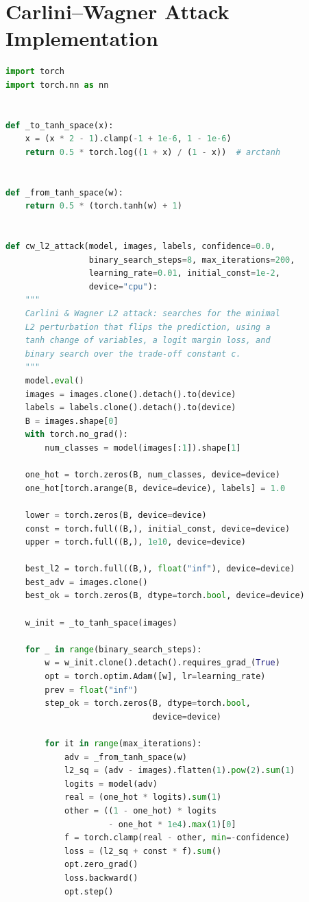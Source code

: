 \section{Carlini--Wagner Attack Implementation}

\begin{lstlisting}[language=Python, caption={Carlini--Wagner $L_2$ Attack Implementation}, label={lst:cw}]
import torch
import torch.nn as nn


def _to_tanh_space(x):
    x = (x * 2 - 1).clamp(-1 + 1e-6, 1 - 1e-6)
    return 0.5 * torch.log((1 + x) / (1 - x))  # arctanh


def _from_tanh_space(w):
    return 0.5 * (torch.tanh(w) + 1)


def cw_l2_attack(model, images, labels, confidence=0.0,
                 binary_search_steps=8, max_iterations=200,
                 learning_rate=0.01, initial_const=1e-2,
                 device="cpu"):
    """
    Carlini & Wagner L2 attack: searches for the minimal
    L2 perturbation that flips the prediction, using a
    tanh change of variables, a logit margin loss, and
    binary search over the trade-off constant c.
    """
    model.eval()
    images = images.clone().detach().to(device)
    labels = labels.clone().detach().to(device)
    B = images.shape[0]
    with torch.no_grad():
        num_classes = model(images[:1]).shape[1]

    one_hot = torch.zeros(B, num_classes, device=device)
    one_hot[torch.arange(B, device=device), labels] = 1.0

    lower = torch.zeros(B, device=device)
    const = torch.full((B,), initial_const, device=device)
    upper = torch.full((B,), 1e10, device=device)

    best_l2 = torch.full((B,), float("inf"), device=device)
    best_adv = images.clone()
    best_ok = torch.zeros(B, dtype=torch.bool, device=device)

    w_init = _to_tanh_space(images)

    for _ in range(binary_search_steps):
        w = w_init.clone().detach().requires_grad_(True)
        opt = torch.optim.Adam([w], lr=learning_rate)
        prev = float("inf")
        step_ok = torch.zeros(B, dtype=torch.bool,
                              device=device)

        for it in range(max_iterations):
            adv = _from_tanh_space(w)
            l2_sq = (adv - images).flatten(1).pow(2).sum(1)
            logits = model(adv)
            real = (one_hot * logits).sum(1)
            other = ((1 - one_hot) * logits
                     - one_hot * 1e4).max(1)[0]
            f = torch.clamp(real - other, min=-confidence)
            loss = (l2_sq + const * f).sum()
            opt.zero_grad()
            loss.backward()
            opt.step()


\end{lstlisting}
